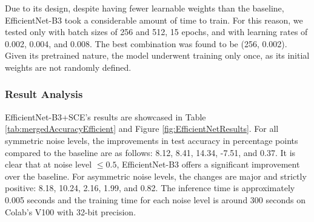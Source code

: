\documentclass[11pt,twocolumn,letterpaper]{article}
\begin{document}
Due to its design, despite having fewer learnable weights than the baseline, EfficientNet-B3 took a considerable amount of time to train. For this reason, we tested only with batch sizes of 256 and 512, 15 epochs, and with learning rates of 0.002, 0.004, and 0.008. The best combination was found to be (256, 0.002). Given its pretrained nature, the model underwent training only once, as its initial weights are not randomly defined.

\subsubsection*{Result Analysis}

EfficientNet-B3+SCE's results are showcased in Table \ref{tab:mergedAccuracyEfficient} and Figure \ref{fig:EfficientNetResults}. For all symmetric noise levels, the improvements in test accuracy in percentage points compared to the baseline are as follows: 8.12, 8.41, 14.34, -7.51, and 0.37. It is clear that at noise level \(\leq 0.5\), EfficientNet-B3 offers a significant improvement over the baseline. For asymmetric noise levels, the changes are major and strictly positive: 8.18, 10.24, 2.16, 1.99, and 0.82. The inference time is approximately 0.005 seconds and the training time for each noise level is around 300 seconds on Colab's V100 with 32-bit precision.
\end{document}

